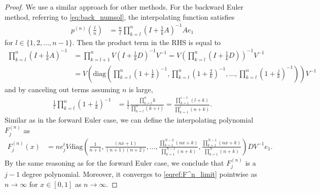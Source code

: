 \documentclass{article}
\theoremstyle{definition}
\newcommand{\pr}[1]{ \left( #1 \right) }
\begin{document}
\begin{proof}
     We use a similar approach for other methods. For the backward Euler method, referring to \eqref{eq:back_numsol}, the interpolating function satisfies
     \begin{align*}
         p^{(n)}\pr{\frac{l}{n}} &= \frac{n}{l}\prod_{k=l}^n \pr{I + \frac{1}{k}A}^{-1}Ae_1
     \end{align*}
     for $l \in \{1, 2, \dots, n-1\}$. Then the product term in the RHS is equal to
     \begin{align*}
         \prod_{k=l}^{n}\pr{ I + \frac{1}{k}A }^{-1}
        &= \prod_{k=l+1}^{n} V \pr{ I + \frac{1}{k}D }^{-1} V^{-1}
        = V \pr{ \prod_{k=l}^{n} \pr{ I + \frac{1}{k}D } }^{-1} V^{-1} \\
        &= V \pr{ \text{diag}\pr{ \prod_{k=l}^{n}\pr{ 1 + \frac{1}{k} }^{-1}, \prod_{k=l}^{n}\pr{ 1 + \frac{2}{k} }^{-1}, \dots, \prod_{k=l}^{n}\pr{ 1 + \frac{j}{k} }^{-1}  } } V^{-1}
     \end{align*}
     and by canceling out terms assuming $n$ is large,
     \begin{align*}
         \frac{1}{l}\prod_{k=l}^{n}\pr{ 1 + \frac{i}{k} }^{-1} 
        &=  \frac{1}{l}  \frac{\prod_{k=l}^{n} k}{\prod_{k=l}^{n} \pr{ k + i }}
        = \frac{\prod_{k=1}^{i-1}\pr{ l + k }}{\prod_{k=1}^{i}\pr{ n + k }}.
     \end{align*}
    Similar as in the forward Euler case, we can define the interpolating polynomial $F_j^{(n)}$ as 
     \begin{align*}
          F_j^{(n)}(x) &= n e_j^{t} V \text{diag}\pr{ \frac{1}{n+1}, \frac{ \pr{ nx+1}}{(n+1)(n+2)}, \dots, \frac{\prod_{k=1}^{N-2}\pr{ nx + k } }{{\prod_{k=1}^{N-1}\pr{ n + k }}}, \frac{\prod_{k=1}^{N-1}\pr{ nx + k } }{{\prod_{k=1}^{N}\pr{ n + k }}}} D V^{-1} e_1.
     \end{align*}
     By the same reasoning as for the forward Euler case, we conclude that $F_j^{(n)}$ is a $j-1$ degree polynomial. Moreover, it converges to \eqref{eqref:F^n_limit} pointwise as $n \to \infty$ for $x \in [0,1]$ as $n \to \infty$.


\end{proof}
\end{document}
